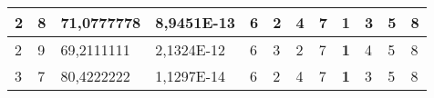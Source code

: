 \documentclass[conference]{IEEEtran}
\begin{document}
\begin{table*}[]
\begin{tabular}{|llll|llllllll|}
\multicolumn{1}{|l|}{2}                                                     & \multicolumn{1}{l|}{8}                                                        & \multicolumn{1}{l|}{71,0777778}                                                   & 8,9451E-13                     & \multicolumn{1}{l|}{6}                                                  & \multicolumn{1}{l|}{2}                                                  & \multicolumn{1}{l|}{4}                                                  & \multicolumn{1}{l|}{7}                                                  & \multicolumn{1}{l|}{\textbf{1}}                                         & \multicolumn{1}{l|}{3}                                                  & \multicolumn{1}{l|}{5}                                                  & 8                          \\ \hline
\multicolumn{1}{|l|}{2}                                                     & \multicolumn{1}{l|}{9}                                                        & \multicolumn{1}{l|}{69,2111111}                                                   & 2,1324E-12                     & \multicolumn{1}{l|}{6}                                                  & \multicolumn{1}{l|}{3}                                                  & \multicolumn{1}{l|}{2}                                                  & \multicolumn{1}{l|}{7}                                                  & \multicolumn{1}{l|}{\textbf{1}}                                         & \multicolumn{1}{l|}{4}                                                  & \multicolumn{1}{l|}{5}                                                  & 8                          \\ \hline
\multicolumn{1}{|l|}{3}                                                     & \multicolumn{1}{l|}{7}                                                        & \multicolumn{1}{l|}{80,4222222}                                                   & 1,1297E-14                     & \multicolumn{1}{l|}{6}                                                  & \multicolumn{1}{l|}{2}                                                  & \multicolumn{1}{l|}{4}                                                  & \multicolumn{1}{l|}{7}                                                  & \multicolumn{1}{l|}{\textbf{1}}                                         & \multicolumn{1}{l|}{3}                                                  & \multicolumn{1}{l|}{5}                                                  & 8                          \\ \hline

\end{tabular}
\end{table*}
\end{document}
